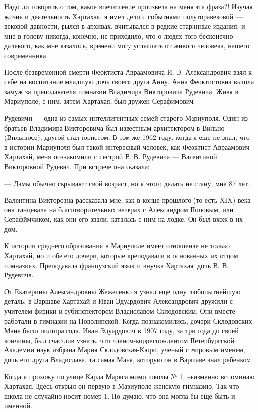 Надо ли говорить о том, какое впечатление произвела на меня эта фраза?! Изучая
жизнь и деятельность Хартахая, я имел дело с событиями полуторавековой —
вековой давности, рылся в архивах, вчитывался в редкие старинные издания, и мне
в голову никогда, конечно, не приходило, что о людях того бесконечно далекого,
как мне казалось, времени могу услышать от живого человека, нашего
современника.

После безвременной смерти Феоктиста Авраамовича И. Э. Александрович взял к себе
на воспитание младшую дочь своего друга Анну. Анна Феоктистовна вышла замуж за
преподавателя гимназии Владимира Викторовича Рудевича. Живя в Мариуполе, с ним,
зятем Хартахая, был дружен Серафимович.

Рудевичи — одна из самых интеллигентных семей старого Мариуполя. Один из
братьев Владимира Викторовича был известным архитектором в Вильно (Вильнюсе),
другой стал юристом. В том же 1962 году, когда я еще не знал, что в истории
Мариуполя был такой интересный человек, как Феоктист Авраамович Хартахай, меня
познакомили с сестрой В. В. Рудевича — Валентиной Викторовной Рудевич. При
встрече она сказала:

— Дамы обычно скрывают свой возраст, но я этого делать не стану, мне 87 лет.

Валентина Викторовна рассказала мне, как в конце прошлого (то есть XIX) века
она танцевала на благотворительных вечерах с Александром Поповым, или Серафймчиком,
как они его звали, каталась с ним на лодке. Он был вхож в их дом.

К истории среднего образования в Мариуполе имеет отношение не только Хартахай,
но и обе его дочери, которые преподавали в основанных их отцом гимназиях.
Преподавала французский язык и внучка Хартахая, дочь В. В. Рудевича.

От Екатерины Александровны Жежеленко я узнал еще одну любопытнейшую деталь: в
Варшаве Хартахай и Иван Эдуардович Александрович дружили с учителем физики и
субинспектором Владиславом Склодовским. Они вместе работали в гимназии на
Новолипской. Когда познакомились, дочери Склодовских Мане было полтора года.
Иван Эдуардович в 1907 году, за три года до своей кончины, был счастлив узнать,
что членом-корреспондентом Петербургской Академии наук избрана Мария
Склодовская-Кюри, ученый с мировым именем, дочь его друга Владислава, та самая
Маня, которую он в Варшаве знал ребенком.

Когда я прохожу по улице Карла Маркса мимо школы № 1, неизменно вспоминаю
Хартахая. Здесь открыл он первую в Мариуполе женскую гимназию. Так что школа
не случайно носит номер 1. Но думаю, что она могла бы еще быть и именной.

